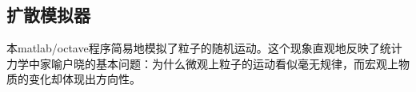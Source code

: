 
\subsection{扩散模拟器}
本matlab/octave程序简易地模拟了粒子的随机运动。这个现象直观地反映了统计力学中家喻户晓的基本问题：为什么微观上粒子的运动看似毫无规律，而宏观上物质的变化却体现出方向性。
